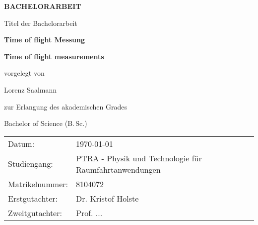 {%
\pagestyle{empty}
\sffamily

\centering%

\vfill
{\bfseries\Huge BACHELORARBEIT}

\vfill
Titel der Bachelorarbeit

{\LARGE\bfseries Time of flight Messung}
\vfill

{\Large\bfseries Time of flight measurements}
\vfill

vorgelegt von

{\Large Lorenz Saalmann}

\vspace{15mm}

zur Erlangung des akademischen Grades

{\Large Bachelor of Science (B.\,Sc.)}
\vfill


\vspace{15mm}

\raggedright
\centering
\begin{tabular}{p{}p{}}
Datum:          & \today \\[1.0ex]
Studiengang:    &  PTRA - Physik und Technologie f\"{u}r Raumfahrtanwendungen\\[1.0ex]
Matrikelnummer: &  8104072\\[1.0ex]
Erstgutachter:  &  Dr. Kristof Holste \\[1.0ex]
Zweitgutachter: &  Prof. ... \\
\end{tabular}
\cleardoublepage
}%